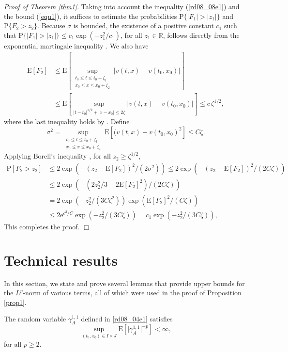 \documentclass[12pt,a4paper]{article}
\newcommand{\R}{{\mathbb{R}}}
\newcommand{\E}{\mathrm{E}}
\renewcommand{\P}{\mathrm{P}}
\newcommand {\deltah}{{\zeta}}
\newcommand{\<}{\langle}
\renewcommand{\>}{\rangle}
\newcommand{\e}{\mathrm{e}}
\begin{document}
  
 \medskip
  \noindent
 {\it Proof of Theorem \ref{thm1}}. 
 Taking into account  the inequality (\ref{rd08_08e1}) and the bound (\ref{equ1}),  it suffices to estimate the probabilities $\P\{\vert F_1 \vert > \vert z_1 \vert\}$ and
 $\P\{F_2> z_2\}$. Because $\sigma$ is bounded, the existence of a positive constant $c_1$ such that $\P\{\vert F_1 \vert > \vert z_1 \vert \} \leq c_1 \exp(-z_1^2/c_1)$, for all $z_1 \in \R$, follows directly from the exponential martingale inequality \cite[Appendix A.2, (A.5)]{nualart2006}. We also have
 \begin{align*}
 \E[F_2] & \le \E \left[  \sup_{\substack {t_0\le t \le t_0+\deltah_1 \\
x_0\le x \le x_0+\deltah_2}}
 |v(t,x) - v(t_0,x_0)| \right]   \\
 & \le  \E \left[  \sup_{ |t-t_0|^{1/2}+|x-x_0| \le 2\deltah}
 |v(t,x) - v(t_0,x_0)| \right] 
  \le c\,  \deltah^{1/2},
 \end{align*}
 where the last inequality holds by \cite[Lemma 4.5]{DKN07}.
 Define 
 \[
 \sigma^2 = \sup_{\substack {t_0\le t \le t_0+\deltah_1 \\
x_0\le x \le x_0+\deltah_2}} \E[ (v(t,x)- v(t_0,x_0)^2] \le C\deltah.
\]
 Applying Borell's inequality \cite[(2.6)]{Adl90}, for all $z_2 \geq  \deltah^{1/2}$,
 \begin{align*}
 \P [F_2>z_2] & \le 2 \exp\left(-(z_2-\E[F_2])^2/(2\sigma^2)\right) \le 2 \exp\left(-(z_2-\E[F_2])^2/(2C\deltah)\right)\\
 & \le 2 \exp\left(-\left(2z^2_2/3-2\E[F_2]^2\right)/(2 C\deltah)\right) \\
 &= 2 \exp\left (-z^2_2/(3C\deltah^2) \right) \exp \left(\E[F_2]^2/( C\deltah)\right) \\
 & \le 2 \e^{c^2/C}\exp\left (-z^2_2/(3C\deltah) \right) 
 = c_1 \exp\left (-z^2_2/(3C\deltah) \right),
 \end{align*}
 This completes the proof.
 \hfill $\Box$
 
  
  \section{Technical results}\label{rd07_02s1}
  In this section, we state and prove several  lemmas that provide upper bounds for the $L^p$-norm of various terms, all of which were used in the proof of Proposition  \ref{prop1}. %
 
 \begin{lemma}\label{lem:gamma_11}
 The random variable $\gamma^{1,1}_A$ defined in \eqref{rd08_04e1}  satisfies
 \begin{equation} \label{for13}
\sup_{(t_0, x_0)\in I\times J} \E\left[\vert\gamma_A^{1,1}\vert^{-p}\right] <\infty,
\end{equation}
 for all $p\ge 2$.
 \end{lemma}
 
\end{document}
